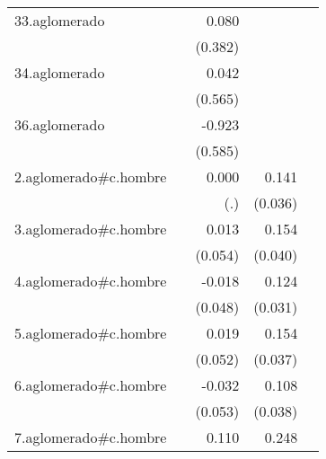 {\begin{longtable}{l*{4}{D{.}{.}{-1}}}
\addlinespace
33.aglomerado&                     &       0.080         &                     &                     \\
            &                     &     (0.382)         &                     &                     \\
\addlinespace
34.aglomerado&                     &       0.042         &                     &                     \\
            &                     &     (0.565)         &                     &                     \\
\addlinespace
36.aglomerado&                     &      -0.923         &                     &                     \\
            &                     &     (0.585)         &                     &                     \\
\addlinespace
2.aglomerado#c.hombre&                     &       0.000         &       0.141\sym{***}&                     \\
            &                     &         (.)         &     (0.036)         &                     \\
\addlinespace
3.aglomerado#c.hombre&                     &       0.013         &       0.154\sym{***}&                     \\
            &                     &     (0.054)         &     (0.040)         &                     \\
\addlinespace
4.aglomerado#c.hombre&                     &      -0.018         &       0.124\sym{***}&                     \\
            &                     &     (0.048)         &     (0.031)         &                     \\
\addlinespace
5.aglomerado#c.hombre&                     &       0.019         &       0.154\sym{***}&                     \\
            &                     &     (0.052)         &     (0.037)         &                     \\
\addlinespace
6.aglomerado#c.hombre&                     &      -0.032         &       0.108\sym{**} &                     \\
            &                     &     (0.053)         &     (0.038)         &                     \\
\addlinespace
7.aglomerado#c.hombre&                     &       0.110\sym{*}  &       0.248\sym{***}&                     \\

\end{longtable}}
